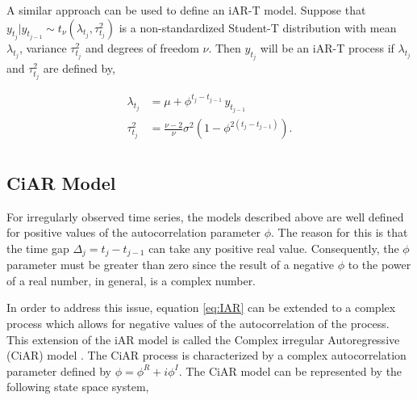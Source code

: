 A similar approach can be used to define an iAR-T model. Suppose that \(y_{t_j}|y_{t_{j-1}} \sim t_{\nu}(\lambda_{t_j},\tau_{t_j}^2)\) is a non-standardized Student-T distribution with mean \(\lambda_{t_j}\), variance \(\tau_{t_j}^2\) and degrees of freedom \(\nu\). Then \(y_{t_j}\) will be an iAR-T process if \(\lambda_{t_j}\) and \(\tau_{t_j}^2\) are defined by,

\begin{equation}
\begin{split}
\lambda_{t_j} &= \mu + \phi^{t_j-t_{j-1}} \, y_{t_{j-1}}\\
\tau_{t_j}^2 &= \frac{\nu-2}{\nu}\sigma^2 \left(1-\phi^{2(t_j-t_{j-1})}\right).\\
\end{split}
\label{eq:IART}
\end{equation}

\subsection{CiAR Model}\label{ciar-model}

For irregularly observed time series, the models described above are well defined for positive values of the autocorrelation parameter \(\phi\). The reason for this is that the time gap \(\Delta_j = t_j-t_{j-1}\) can take any positive real value. Consequently, the \(\phi\) parameter must be greater than zero since the result of a negative \(\phi\) to the power of a real number, in general, is a complex number.

In order to address this issue, equation \eqref{eq:IAR} can be extended to a complex process which allows for negative values of the autocorrelation of the process. This extension of the iAR model is called the Complex irregular Autoregressive (CiAR) model \citep{Elorrieta_2019}. The CiAR process is characterized by a complex autocorrelation parameter defined by \(\phi= \phi^R + i \phi^I\). The CiAR model can be represented by the following state space system,

